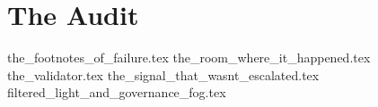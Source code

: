 \section{The Audit}

{the_footnotes_of_failure.tex}
{the_room_where_it_happened.tex}
{the_validator.tex}
{the_signal_that_wasnt_escalated.tex}
{filtered_light_and_governance_fog.tex}
